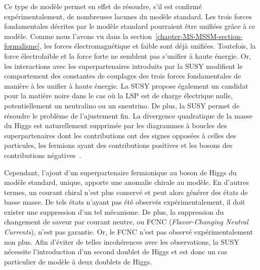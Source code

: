 Ce type de modèle permet en effet de résoudre, s'il est confirmé expérimentalement, de nombreuses lacunes du modèle standard.
Les trois forces fondamentales décrites par le modèle standard pourraient être unifiées grâce à ce modèle.
Comme nous l'avons vu dans la section~\ref{chapter-MS-MSSM-section-formalisme}, les forces électromagnétique et faible sont déjà unifiées.
Toutefois, la force électrofaible et la force forte ne semblent pas s'unifier à haute énergie.
Or, les interactions avec les superpartenaires introduits par la SUSY modifient le comportement des constantes de couplages des trois forces fondamentales de manière à les unifier à haute énergie.
La SUSY propose également un candidat pour la matière noire dans le cas où la LSP est de charge électrique nulle, potentiellement un neutralino ou un sneutrino.
De plus, la SUSY permet de résoudre le problème de l'ajustement fin.
La divergence quadratique de la masse du Higgs est naturellement supprimée par les diagrammes à boucles des superpartenaires dont les contributions ont des signes opposées à celles des particules, les fermions ayant des contributions positives et les bosons des contributions négatives~\cite{Higgs_hunter_guide}.
\par Cependant, l'ajout d'un superpartenaire fermionique au boson de Higgs du modèle standard, unique, apporte une anomalie chirale au modèle.
En d'autres termes, un courant chiral n'est plus conservé et peut alors générer des états de basse masse.
De tels états n'ayant pas été observés expérimentalement, il doit exister une suppression d'un tel mécanisme.
De plus, la suppression du changement de saveur par courant neutre, ou FCNC (\emph{Flavor-Changing Neutral Currents}), n'est pas garantie.
Or, le FCNC n'est pas observé expérimentalement non plus.
Afin d'éviter de telles incohérences avec les observations, la SUSY nécessite l'introduction d'un second doublet de Higgs et est donc un cas particulier de modèle à deux doublets de Higgs.
